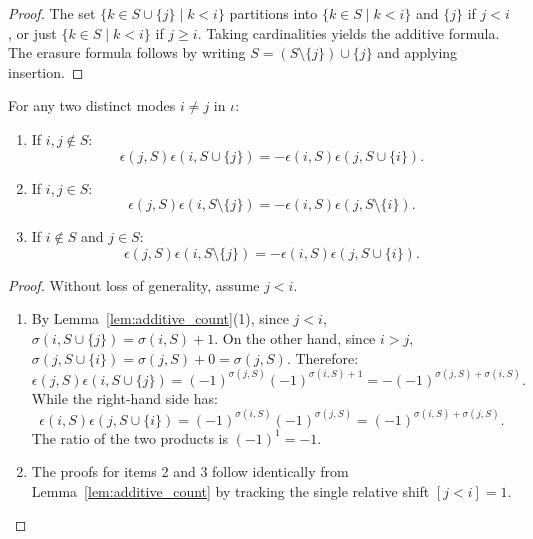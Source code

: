 \begin{proof}
The set $\{k \in S \cup \{j\} \mid k < i\}$ partitions into $\{k \in S \mid k < i\}$ and $\{j\}$ if $j < i$, or just $\{k \in S \mid k < i\}$ if $j \ge i$. Taking cardinalities yields the additive formula. The erasure formula follows by writing $S = (S \setminus \{j\}) \cup \{j\}$ and applying insertion.
\end{proof}

\begin{theorem}
\label{thm:app_sign_exchange}
For any two distinct modes $i \neq j$ in $\iota$:
\begin{enumerate}
    \item If $i, j \notin S$:
    \begin{equation}
    \epsilon(j, S) \epsilon(i, S \cup \{j\}) = - \epsilon(i, S) \epsilon(j, S \cup \{i\}).
    \end{equation}
    \item If $i, j \in S$:
    \begin{equation}
    \epsilon(j, S) \epsilon(i, S \setminus \{j\}) = - \epsilon(i, S) \epsilon(j, S \setminus \{i\}).
    \end{equation}
    \item If $i \notin S$ and $j \in S$:
    \begin{equation}
    \epsilon(j, S) \epsilon(i, S \setminus \{j\}) = - \epsilon(i, S) \epsilon(j, S \cup \{i\}).
    \end{equation}
\end{enumerate}
\end{theorem}

\begin{proof}
Without loss of generality, assume $j < i$.
\begin{enumerate}
    \item By Lemma~\ref{lem:additive_count}(1), since $j < i$, $\sigma(i, S \cup \{j\}) = \sigma(i, S) + 1$.
    On the other hand, since $i > j$, $\sigma(j, S \cup \{i\}) = \sigma(j, S) + 0 = \sigma(j, S)$.
    Therefore:
    \[
    \epsilon(j, S) \epsilon(i, S \cup \{j\}) = (-1)^{\sigma(j, S)} (-1)^{\sigma(i, S) + 1} = - (-1)^{\sigma(j, S) + \sigma(i, S)}.
    \]
    While the right-hand side has:
    \[
    \epsilon(i, S) \epsilon(j, S \cup \{i\}) = (-1)^{\sigma(i, S)} (-1)^{\sigma(j, S)} = (-1)^{\sigma(i, S) + \sigma(j, S)}.
    \]
    The ratio of the two products is $(-1)^1 = -1$.
    \item The proofs for items 2 and 3 follow identically from Lemma~\ref{lem:additive_count} by tracking the single relative shift $[j < i] = 1$.
\end{enumerate}
\end{proof}

